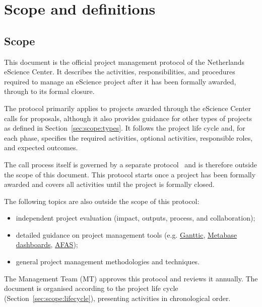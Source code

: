 \section{Scope and definitions}
\label{sec:scope}

\subsection{Scope}
\label{sec:scope:sc}

This document is the official project management protocol of the Netherlands eScience Center. It describes the
activities, responsibilities, and procedures required to manage an eScience project after it has been formally awarded, 
through to its formal closure.

The protocol primarily applies to projects awarded through the eScience Center calls for proposals, although it also 
provides guidance for other types of projects as defined in Section~\ref{sec:scope:types}. It follows the project life
cycle and, for each phase, specifies the required activities, optional activities, responsible roles, and expected
outcomes.

The call process itself is governed by a separate protocol~\cite{call-protocol-2015} and is therefore outside the scope 
of this document. This protocol starts once a project has been formally awarded and covers all activities until the 
project is formally closed.

The following topics are also outside the scope of this protocol:
\vspace{-0.2cm}
\begin{itemize}
    \item independent project evaluation (impact, outputs, process, and collaboration);
    \item detailed guidance on project management tools (e.g. \href{https://www.ganttic.com/}{Ganttic}, 
    \href{https://www.metabase.com/}{Metabase dashboards}, \href{https://www.afas.nl/}{AFAS});
    \item general project management methodologies and techniques.
\end{itemize}
\vspace{-0.2cm}

The Management Team (MT) approves this protocol and reviews it annually. The document is organised according to the 
project life cycle (Section~\ref{sec:scope:lifecycle}), presenting activities in chronological order.

